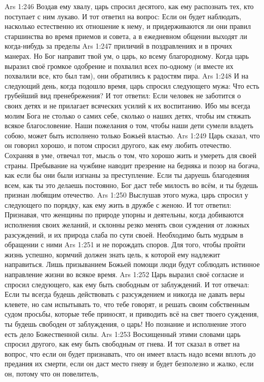 \vs Ars 1:246
Воздав ему хвалу, царь спросил десятого, как ему распознать тех, кто поступает с ним лукаво. И тот ответил на вопрос: Если он будет наблюдать, насколько естественно их отношение к нему, и придерживаются ли они правил старшинства во время приемов и совета, а в ежедневном общении выходят ли когда-нибудь за пределы
\vs Ars 1:247
приличий в поздравлениях и в прочих манерах. Но Бог направит твой ум, о царь, ко всему благородному. Когда царь выразил своё громкое одобрение и похвалил всех по-одному (и вместе их похвалили все, кто был там), они обратились к радостям пира.
\vs Ars 1:248
И на следующий день, когда подошло время, царь спросил следующего мужа: Что есть грубейший вид пренебрежения? И тот ответил: Если человек не заботится о своих детях и не прилагает всяческих усилий к их воспитанию. Ибо мы всегда молим Бога не столько о самих себе, сколько о наших детях, чтобы им стяжать всякое благословение. Наши пожелания о том, чтобы наши дети сумели владеть собою, может быть исполнено только Божьей властью.
\vs Ars 1:249
Царь сказал, что он говорил хорошо, и потом спросил другого, как ему любить отечество. Сохраняя в уме, отвечал тот, мысль о том, что хорошо жить и умереть для своей страны. Пребывание на чужбине наводит презрение на бедняка и позор на богача, как если бы они были изгнаны за преступление. Если ты даруешь благодеяния всем, как ты это делаешь постоянно, Бог даст тебе милость во всём, и ты будешь признан любящим отечество.
\vs Ars 1:250
Выслушав этого мужа, царь спросил у следующего по порядку, как ему жить в дружбе с женою. И тот ответил: Признавая, что женщины по природе упорны и деятельны, когда добиваются исполнения своих желаний, и склонны резко менять свои суждения от ложных разсуждений, и их природа слаба по сути своей. Необходимо быть мудрым в обращении с ними
\vs Ars 1:251
и не порождать споров. Для того, чтобы пройти жизнь успешно, кормчий должен знать цель, к которой ему надлежит направиться. Лишь призыванием Божьей помощи люди будут соблюдать истинное направление жизни во всякое время.
\vs Ars 1:252
Царь выразил своё согласие и спросил следующего, как ему быть свободным от заблуждений. И тот отвечал: Если ты всегда будешь действовать с разсуждением и никогда не давать веры клевете, но сам испытывать то, что тебе говорят, и решать своим собственным судом просьбы, которые тебе приносят, и приводить всё на свет твоего суждения, ты будешь свободен от заблуждения, о царь! Но познание и исполнение этого есть дело Божественной силы.
\vs Ars 1:253
Восхищенный этими словами царь спросил другого, как ему быть свободным от гнева. И тот сказал в ответ на вопрос, что если он будет признавать, что он имеет власть надо всеми вплоть до предания их смерти, если он даст место гневу и будет безполезно и жалко, если он, потому что он повелитель,
